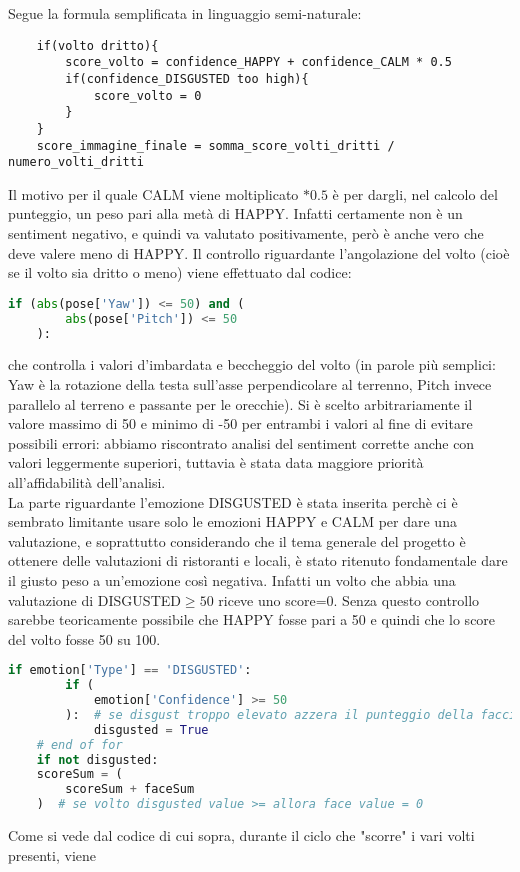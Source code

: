 Segue la formula semplificata in linguaggio semi-naturale:
\begin{lstlisting}
    if(volto dritto){
        score_volto = confidence_HAPPY + confidence_CALM * 0.5 
        if(confidence_DISGUSTED too high){
            score_volto = 0
        }
    }
    score_immagine_finale = somma_score_volti_dritti / numero_volti_dritti
\end{lstlisting}
Il motivo per il quale CALM viene moltiplicato $*0.5$ è per dargli, nel calcolo del punteggio, un
peso pari alla metà di HAPPY. Infatti certamente non è un sentiment negativo, e quindi va
valutato positivamente, però è anche vero che deve valere meno di HAPPY.
Il controllo riguardante l'angolazione del volto (cioè se il volto sia dritto o meno) viene
effettuato dal codice:
\begin{lstlisting}[language=Python]
    if (abs(pose['Yaw']) <= 50) and (
        abs(pose['Pitch']) <= 50
    ):
\end{lstlisting}
che controlla i valori d'imbardata e beccheggio del volto (in parole più semplici: Yaw è 
la rotazione della testa sull'asse perpendicolare al terrenno, Pitch invece parallelo al 
terreno e passante per le orecchie). Si è scelto arbitrariamente il valore massimo di 50 e minimo 
di -50 per entrambi i valori al fine di evitare possibili errori: abbiamo riscontrato analisi del 
sentiment corrette anche con valori leggermente superiori, tuttavia è stata data maggiore priorità
all'affidabilità dell'analisi. \\
La parte riguardante l'emozione DISGUSTED è stata inserita perchè ci è sembrato limitante usare
solo le emozioni HAPPY e CALM per dare una valutazione, e soprattutto considerando che il tema
generale del progetto è ottenere delle valutazioni di ristoranti e locali, è stato ritenuto
fondamentale dare il giusto peso a un'emozione così negativa. Infatti un volto che abbia una
valutazione di DISGUSTED$\geq50$ riceve uno score=0. Senza questo controllo sarebbe teoricamente
possibile che HAPPY fosse pari a 50 e quindi che lo score del volto fosse 50 su 100.
\begin{lstlisting}[language=Python]
        if emotion['Type'] == 'DISGUSTED':
        if (
            emotion['Confidence'] >= 50
        ):  # se disgust troppo elevato azzera il punteggio della faccia
            disgusted = True
    # end of for
    if not disgusted:
    scoreSum = (
        scoreSum + faceSum
    )  # se volto disgusted value >= allora face value = 0
\end{lstlisting}
Come si vede dal codice di cui sopra, durante il ciclo che "scorre" i vari volti presenti, viene
